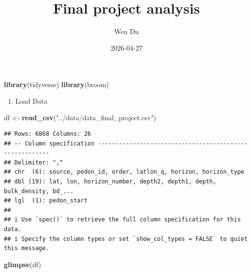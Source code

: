 \documentclass[
]{article}
\title{Final project analysis}
\author{Wen Du}
\date{2026-04-27}
\newenvironment{Shaded}{\begin{snugshade}}{\end{snugshade}}
\newcommand{\FunctionTok}[1]{\textcolor[rgb]{0.13,0.29,0.53}{\textbf{#1}}}
\newcommand{\NormalTok}[1]{#1}
\newcommand{\OtherTok}[1]{\textcolor[rgb]{0.56,0.35,0.01}{#1}}
\newcommand{\StringTok}[1]{\textcolor[rgb]{0.31,0.60,0.02}{#1}}
\providecommand{\tightlist}{%
  \setlength{\itemsep}{0pt}\setlength{\parskip}{0pt}}
\begin{document}
\maketitle

\begin{Shaded}
\begin{Highlighting}[]
\FunctionTok{library}\NormalTok{(tidyverse)}
\FunctionTok{library}\NormalTok{(broom)}
\end{Highlighting}
\end{Shaded}

\begin{enumerate}
\def\labelenumi{\arabic{enumi}.}
\tightlist
\item
  Load Data
\end{enumerate}

\begin{Shaded}
\begin{Highlighting}[]
\NormalTok{df }\OtherTok{\textless{}{-}} \FunctionTok{read\_csv}\NormalTok{(}\StringTok{"../data/data\_final\_project.csv"}\NormalTok{)}
\end{Highlighting}
\end{Shaded}

\begin{verbatim}
## Rows: 6868 Columns: 26
## -- Column specification --------------------------------------------------------
## Delimiter: ","
## chr  (6): source, pedon_id, order, latlon_q, horizon, horizon_type
## dbl (19): lat, lon, horizon_number, depth2, depth1, depth, bulk_density, bd_...
## lgl  (1): pedon_start
## 
## i Use `spec()` to retrieve the full column specification for this data.
## i Specify the column types or set `show_col_types = FALSE` to quiet this message.
\end{verbatim}

\begin{Shaded}
\begin{Highlighting}[]
\FunctionTok{glimpse}\NormalTok{(df)}
\end{Highlighting}
\end{Shaded}
\end{document}
